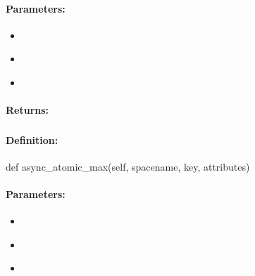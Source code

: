 \paragraph{Parameters:}
\begin{itemize}[noitemsep]
\item {}\\

\item {}\\

\item {}\\

\end{itemize}

\paragraph{Returns:}


\pagebreak
\subsubsection{}
\label{api:python:async_atomic_max}


\paragraph{Definition:}
\begin{pythoncode}
def async_atomic_max(self, spacename, key, attributes)
\end{pythoncode}

\paragraph{Parameters:}
\begin{itemize}[noitemsep]
\item {}\\

\item {}\\

\item {}\\

\end{itemize}

